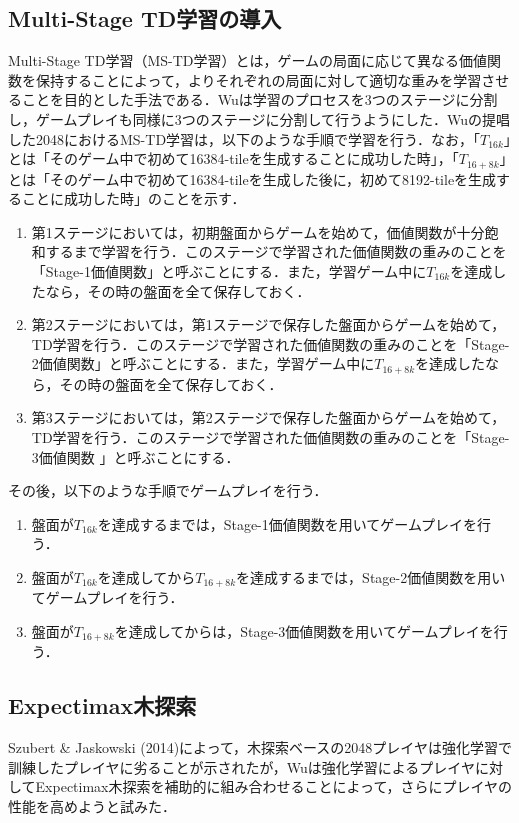 \documentclass{suribt}
\begin{document}
\subsection{Multi-Stage TD学習の導入}
Multi-Stage TD学習（MS-TD学習）とは，ゲームの局面に応じて異なる価値関数を保持することによって，よりそれぞれの局面に対して適切な重みを学習させることを目的とした手法である．Wuは学習のプロセスを3つのステージに分割し，ゲームプレイも同様に3つのステージに分割して行うようにした．Wuの提唱した2048におけるMS-TD学習は，以下のような手順で学習を行う．なお，「$T_{16k}$」とは「そのゲーム中で初めて16384-tileを生成することに成功した時」，「$T_{16+8k}$」とは「そのゲーム中で初めて16384-tileを生成した後に，初めて8192-tileを生成することに成功した時」のことを示す．

\begin{enumerate}
\item 第1ステージにおいては，初期盤面からゲームを始めて，価値関数が十分飽和するまで学習を行う．このステージで学習された価値関数の重みのことを「Stage-1価値関数」と呼ぶことにする．また，学習ゲーム中に$T_{16k}$を達成したなら，その時の盤面を全て保存しておく．
\item 第2ステージにおいては，第1ステージで保存した盤面からゲームを始めて，TD学習を行う．このステージで学習された価値関数の重みのことを「Stage-2価値関数」と呼ぶことにする．また，学習ゲーム中に$T_{16+8k}$を達成したなら，その時の盤面を全て保存しておく．
\item 第3ステージにおいては，第2ステージで保存した盤面からゲームを始めて，TD学習を行う．このステージで学習された価値関数の重みのことを「Stage-3価値関数
」と呼ぶことにする．
\end{enumerate}

その後，以下のような手順でゲームプレイを行う．

\begin{enumerate}
\item 盤面が$T_{16k}$を達成するまでは，Stage-1価値関数を用いてゲームプレイを行う．
\item 盤面が$T_{16k}$を達成してから$T_{16+8k}$を達成するまでは，Stage-2価値関数を用いてゲームプレイを行う．
\item 盤面が$T_{16+8k}$を達成してからは，Stage-3価値関数を用いてゲームプレイを行う．
\end{enumerate}

\subsection{Expectimax木探索}
Szubert \& Jaskowski (2014)によって，木探索ベースの2048プレイヤは強化学習で訓練したプレイヤに劣ることが示されたが，Wuは強化学習によるプレイヤに対してExpectimax木探索を補助的に組み合わせることによって，さらにプレイヤの性能を高めようと試みた．
\end{document}
